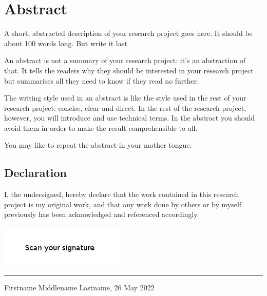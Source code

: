 \chapter*{Abstract} 

A short, abstracted description of your research project goes here. 
It should be about 100 words long. But write it last.

An abstract is not a summary of your research project: it's an abstraction of that. 
It tells the readers why they should be interested in your research project but summarises all
they need to know if they read no further.

The writing style used in an abstract is like the style used in the rest of your research project: concise, clear and direct. 
In the rest of the research project, however, you will introduce and use technical terms. In the abstract you should
avoid them in order to make the result comprehensible to all.

You may like to repeat the abstract in your mother tongue.



\vfill
\section*{Declaration}
I, the undersigned, hereby declare that the work contained in this research project is my original work, and that any work done by others or by myself previously has been acknowledged and referenced accordingly.

\includegraphics[height=2cm]{images/signature.png} \newline \hrule
Firstname Middlename Lastname, 26 May 2022

